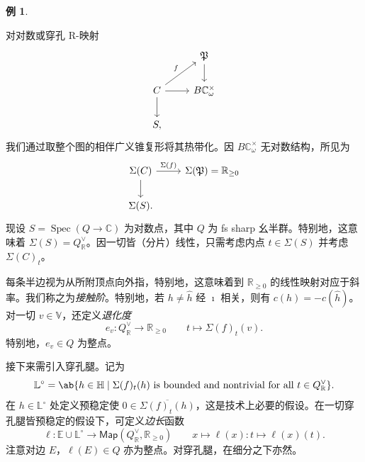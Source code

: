 \documentclass{amsart}
\theoremstyle{definition}
\newtheorem{exm}[thm]{例}
\theoremstyle{remark}
\theoremstyle{plain}
\theoremstyle{definition}
\theoremstyle{remark}
\newcommand{\R}{\mathbb{R}}
\newcommand{\C}{\mathbb{C}}
\newcommand{\E}{\mathbb{E}}
\newcommand{\V}{\mathbb{V}}
\renewcommand{\H}{\mathbb{H}}
\renewcommand{\L}{\mathbb{L}}
\newcommand{\mf}[1]{\mathfrak{#1}}
\newcommand{\ms}[1]{\mathsf{#1}}
\newcommand{\ol}[1]{\overline{#1}}
\newcommand{\1}{\mathbf{1}}
\newcommand{\2}{\mathbf{2}}
\newcommand{\3}{\mathbf{3}}
\DeclareMathOperator{\Spec}{Spec}
\begin{document}
\begin{exm}
\begin{center}
    \end{center}
\end{exm}

对对数或穿孔 R-映射
\begin{equation*}
\begin{tikzcd}
    & \mf{P} \ar{d} \\
    C \ar{ur}{f} \ar{d} \ar{r} & B \C_{\omega}^{\times} \\
    S,
\end{tikzcd}
\end{equation*}
我们通过取整个图的相伴广义锥复形将其热带化。因 \(B \C_{\omega}^{\times}\) 无对数结构，所见为
\begin{equation*}
\begin{tikzcd}
    \Sigma(C) \ar{d} \ar{r}{\Sigma(f)} & \Sigma(\mf{P}) = \R_{\geq 0} \\
    \Sigma(S).
\end{tikzcd}
\end{equation*}
现设 \(S = \Spec (Q \to \C)\) 为对数点，其中 \(Q\) 为 fs sharp 幺半群。特别地，这意味着 \(\Sigma(S) = Q_{\R}^{\vee}\)。因一切皆（分片）线性，只需考虑内点 \(t \in \Sigma(S)\) 并考虑 \(\Sigma(C)_t\)。

每条半边视为从所附顶点向外指，特别地，这意味着到 \(\R_{\geq 0}\) 的线性映射对应于斜率。我们称之为\textit{接触阶}。特别地，若 \(h \neq \hat{h}\) 经 \(\imath\) 相关，则有 \(c(h) = - c(\hat{h})\)。对一切 \(v \in \V\)，还定义\textit{退化度}
\[ e_v \colon Q_{\R}^{\vee} \to \R_{\geq 0} \qquad t \mapsto \Sigma(f)_t (v). \]
特别地，\(e_v \in Q\) 为整点。

接下来需引入穿孔腿。记为
\[ \L^{\circ} = \ab\{ h \in \H \mid \Sigma(f)_t(h) \text{ is bounded and nontrivial for all } t \in Q_{\R}^{\vee}\}. \]
在 \(h \in \L^{\circ}\) 处定义预稳定使 \(0 \in \ol{\Sigma(f)_t(h)}\)，这是技术上必要的假设。在一切穿孔腿皆预稳定的假设下，可定义\textit{边长}函数
\[ \ell \colon \E \cup \L^{\circ} \to \ms{Map}(Q_{\R}^{\vee}, \R_{\geq 0}) \qquad x \mapsto \ell(x) \colon t \mapsto \ell(x)(t). \]
注意对边 \(E\)，\(\ell(E) \in Q\) 亦为整点。对穿孔腿，在细分之下亦然。
\end{document}
